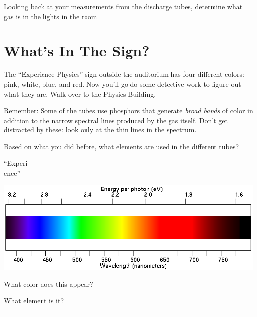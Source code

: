 \documentclass[11pt]{article}
\begin{document}
Looking back at your measurements from the discharge tubes, determine what gas is in the lights in the room
\bigskip

\section{ What's In The Sign?}

The ``Experience Physics'' sign outside the auditorium has four different colors: pink, white, blue, and red. Now you'll go do some detective work to figure out what they are. Walk over to the Physics Building.

Remember: Some of the tubes use phosphors that generate {\it broad bands} of color in addition to the narrow spectral
lines produced by the gas itself. Don't get distracted by these: look only at the thin lines in the spectrum.

Based on what you
did before, what elements are used in the different tubes?

\begin{minipage}{0.1\textwidth}
	\begin{center}
		``Experi-\\ence''
	\end{center}
\end{minipage}
\begin{minipage}{0.8\textwidth}
	\includegraphics[width=\textwidth]{spectrum2.png}
\end{minipage}

\begin{minipage}{0.5\textwidth}
	What color does this appear?
\end{minipage}
\begin{minipage}{0.5\textwidth}
	What element is it?
\end{minipage}


\vspace{0.7in}
\hrule
\end{document}
